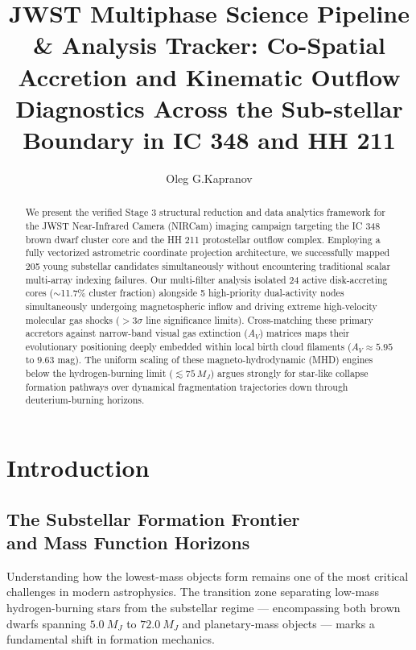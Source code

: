\documentclass[twocolumn]{aastex63}
\begin{document}
\title{JWST Multiphase Science Pipeline \& Analysis Tracker: Co-Spatial Accretion and Kinematic Outflow Diagnostics Across the Sub-stellar Boundary in IC 348 and HH 211}

\author{Oleg G.Kapranov}

\begin{abstract}
We present the verified Stage 3 structural reduction and data analytics framework for the JWST Near-Infrared Camera (NIRCam) imaging campaign targeting the IC 348 brown dwarf cluster core and the HH 211 protostellar outflow complex. Employing a fully vectorized astrometric coordinate projection architecture, we successfully mapped 205 young substellar candidates simultaneously without encountering traditional scalar multi-array indexing failures. Our multi-filter analysis isolated 24 active disk-accreting cores ($\sim$11.7\% cluster fraction) alongside 5 high-priority dual-activity nodes simultaneously undergoing magnetospheric inflow and driving extreme high-velocity molecular gas shocks ($>3\sigma$ line significance limits). Cross-matching these primary accretors against narrow-band visual gas extinction ($A_V$) matrices maps their evolutionary positioning deeply embedded within local birth cloud filaments ($A_V \approx 5.95$ to $9.63$ mag). The uniform scaling of these magneto-hydrodynamic (MHD) engines below the hydrogen-burning limit ($\lesssim 75\,M_J$) argues strongly for star-like collapse formation pathways over dynamical fragmentation trajectories down through deuterium-burning horizons.
\end{abstract}
\section{Introduction}
\label{sec:intro}

\subsection[The Substellar Formation Frontier and Mass Function Horizons]{The Substellar Formation Frontier \\ and Mass Function Horizons}
Understanding how the lowest-mass objects form remains one of the most critical challenges in modern astrophysics. The transition zone separating low-mass hydrogen-burning stars from the substellar regime --- \allowbreak encompassing both brown dwarfs spanning $5.0~M_J$ to $72.0~M_J$ and planetary-mass objects --- marks a fundamental shift in formation mechanics.
\end{document}
